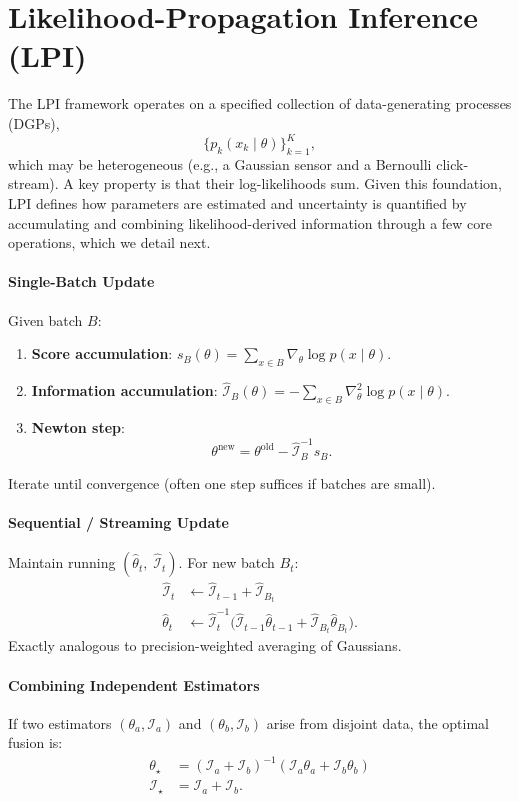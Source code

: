\documentclass[11pt]{article}
\begin{document}
\section{Likelihood-Propagation Inference (LPI)}
The LPI framework operates on a specified collection of data-generating processes (DGPs), 
\begin{equation}
\{p_k(x_k\mid\theta)\}_{k=1}^K,
\end{equation}
which may be heterogeneous (e.g., a Gaussian sensor and a Bernoulli click-stream). A key property is that their log-likelihoods sum. Given this foundation, LPI defines how parameters are estimated and uncertainty is quantified by accumulating and combining likelihood-derived information through a few core operations, which we detail next.

\paragraph{Single-Batch Update}
Given batch $B$:
\begin{enumerate}
\item \textbf{Score accumulation}: $s_B(\theta)=\sum_{x\in B}\nabla_\theta\log p(x\mid\theta)$.
\item \textbf{Information accumulation}: $\hat{\mathcal I}_B(\theta) = -\sum_{x\in B}\nabla_\theta^2 \log p(x\mid\theta)$.
\item \textbf{Newton step}:
\begin{equation}
\theta^{\text{new}} = \theta^{\text{old}} - \hat{\mathcal I}_B^{-1} s_B.
\end{equation}
\end{enumerate}
Iterate until convergence (often one step suffices if batches are small).

\paragraph{Sequential / Streaming Update}
Maintain running $(\hat\theta_t,\;\hat{\mathcal I}_t)$. For new batch $B_t$:
\begin{align}
\hat{\mathcal I}_{t} &\leftarrow \hat{\mathcal I}_{t-1} + \hat{\mathcal I}_{B_t}\\
\hat\theta_{t} &\leftarrow \hat{\mathcal I}_{t}^{-1}\bigl(\hat{\mathcal I}_{t-1}\hat\theta_{t-1} + \hat{\mathcal I}_{B_t}\hat\theta_{B_t}\bigr).
\end{align}
Exactly analogous to precision-weighted averaging of Gaussians.

\paragraph{Combining Independent Estimators}
If two estimators $(\theta_a,\mathcal I_a)$ and $(\theta_b,\mathcal I_b)$ arise from disjoint data, the optimal fusion is:
\begin{align}
\theta_\star &= (\mathcal I_a+\mathcal I_b)^{-1}(\mathcal I_a\theta_a+\mathcal I_b\theta_b)\\
\mathcal I_\star &= \mathcal I_a+\mathcal I_b.
\end{align}
\end{document}
